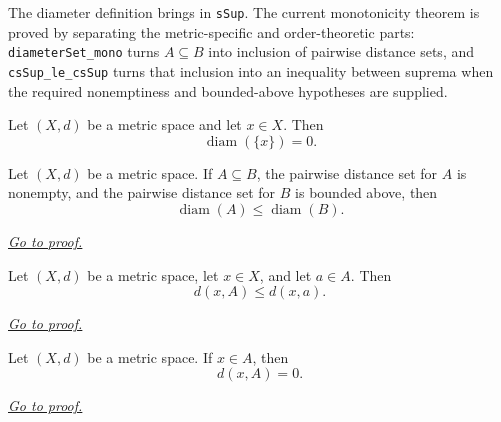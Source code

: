 \begin{remark*}
The diameter definition brings in \texttt{sSup}. The current monotonicity
theorem is proved by separating the metric-specific and order-theoretic parts:
\texttt{diameterSet\_mono} turns \(A\subseteq B\) into inclusion of pairwise
distance sets, and \texttt{csSup\_le\_csSup} turns that inclusion into an
inequality between suprema when the required nonemptiness and bounded-above
hypotheses are supplied.
\end{remark*}

\begin{remark*}
\begin{theorem*}
Let $(X,d)$ be a metric space and let \(x\in X\). Then
\[
  \operatorname{diam}(\{x\})=0.
\]
\end{theorem*}
\end{remark*}

\begin{remark*}
\label{thm:fv-msml-diameter-monotone-under-inclusion}
\begin{theorem*}
Let $(X,d)$ be a metric space. If \(A\subseteq B\), the pairwise distance set
for \(A\) is nonempty, and the pairwise distance set for \(B\) is bounded
above, then
\[
  \operatorname{diam}(A)\leq \operatorname{diam}(B).
\]
\end{theorem*}
\hyperref[prf:fv-msml-diameter-monotone-under-inclusion]{\textit{Go to proof.}}
\end{remark*}

\begin{remark*}
\label{thm:fv-msml-distance-to-set-le-distance-to-point-of-mem}
\begin{theorem*}
Let $(X,d)$ be a metric space, let \(x\in X\), and let \(a\in A\). Then
\[
  d(x,A)\leq d(x,a).
\]
\end{theorem*}
\hyperref[prf:fv-msml-distance-to-set-le-distance-to-point-of-mem]{\textit{Go to proof.}}
\end{remark*}

\begin{remark*}
\label{thm:fv-msml-distance-to-set-eq-zero-of-mem}
\begin{theorem*}
Let $(X,d)$ be a metric space. If \(x\in A\), then
\[
  d(x,A)=0.
\]
\end{theorem*}
\hyperref[prf:fv-msml-distance-to-set-eq-zero-of-mem]{\textit{Go to proof.}}
\end{remark*}

